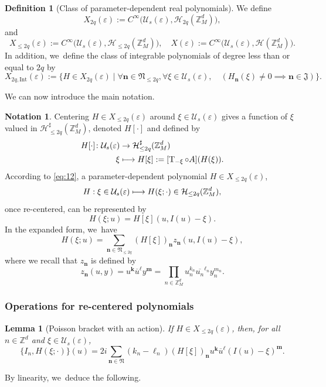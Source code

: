 \documentclass[10pt,a4paper]{amsart}
\newcommand\mto{\mathchoice{\longmapsto}{\mapsto}{\mapsto}{\mapsto}}
\theoremstyle{plain}
\newtheorem{lemma}[theorem]{Lemma}
\theoremstyle{definition}
\newtheorem{definition}[theorem]{Definition}
\newtheorem{notation}[theorem]{Notation}
\newcommand{\nb}{{\boldsymbol n}}
\newcommand{\kb}{{\boldsymbol k}}
\newcommand{\lb}{{\boldsymbol \ell}}
\newcommand{\mb}{{\boldsymbol m}}
\newcommand{\Nb}{{\boldsymbol{\mathfrak{N}}}}
\newcommand{\Z}{\mathbb{Z}}
\newcommand{\1}{\mathbf{1}}
\let\epsilon\varepsilon
\providecommand{\Subsubsection}{\subsubsection}
\providecommand{\Subsubsection}{\subsubsection}
\begin{document}
\begin{definition}[Class of parameter-dependent real polynomials]
\label{def:class}
We define
\begin{equation}
\label{eq:X}
X_{2q}(\epsilon):= C^{\infty}
\big(
\mathcal{U}_{s}(\epsilon),\mathcal{H}_{2q}(\Z_{M}^{d})
\big),
\end{equation}
and
\[
X_{\leq 2q}(\epsilon):= C^{\infty}
\big(
\mathcal{U}_{s}(\epsilon),\mathcal{H}_{\leq 2q}(\Z_{M}^{d})
\big),
\quad
X(\epsilon):= C^{\infty}
\big(
\mathcal{U}_{s}(\epsilon),\mathcal{H}(\Z_{M}^{d})
\big).
\]
In addition, we~define the class of integrable polynomials of degree less than or equal to $2q$ by
\[
X_{2q,\mathrm{Int}}(\epsilon) :=
\{
H\in X_{2q}(\epsilon)\mid \forall \nb\in\Nb_{\leq2q},\forall \xi\in\mathcal{U}_{s}(\epsilon),\quad (H_{\nb}(\xi)\neq0 \implies \nb\in\mathfrak{J})
\}.
\]
\end{definition}

We can now introduce the main notation.
\begin{notation}
\label{not}
Centering $H\in X_{\leq2q}(\epsilon)$ around $\xi\in\mathcal{U}_{s}(\epsilon)$ gives a function of $\xi$ valued in $\mathcal{H}_{\leq 2q}^{\sharp}(\Z_{M}^{d})$, denoted $H[\cdot]$ and defined by
\[
\begin{aligned}
H[\cdot]\colon\mathcal{U}_{s}(\epsilon)&
\to\mathcal{H}_{\leq 2q}^{\sharp}(\Z_{M}^{d})\\
\xi&\mto H[\xi]:=[\operatorname{T}_{-\xi}\circ A](H(\xi)).
\end{aligned}
\]
According to \eqref{eq:12}, a parameter-dependent polynomial $H\in X_{\leq2q}(\epsilon)$,
\[
H: \xi\in\mathcal{U}_{s}(\epsilon)\mto H(\xi;\cdot) \in \mathcal{H}_{\leq2q}(\Z_{M}^{d}),
\]
once re-centered, can be represented by
\begin{equation}
\label{eq:H-cano}
H(\xi;u) = H[\xi](u,I(u)-\xi).
\end{equation}
In the expanded form, we~have
\[
H(\xi;u) = \sum_{\nb\in\Nb_{\leq2q}}(H[\xi])_{\nb}z_{\nb}(u,I(u)-\xi),
\]
where we recall that $z_{\nb}$ is defined by
\[
z_{\nb}(u,y) = u^{\kb}\overline{u}^{\lb}y^{\mb} = \prod_{n\in\Z_{M}^{d}}u_{n}^{k_{n}}\overline{u_{n}}^{\ell_{n}}y_{n}^{m_{n}}.
\]
\end{notation}

\Subsubsection{Operations for re-centered polynomials}
\begin{lemma}[Poisson bracket with an action] If $H\in X_{\leq2q}(\epsilon)$, then, for all $n\in\Z^{d}$ and $\xi\in\mathcal{U}_{s}(\epsilon)$,
\begin{equation}
\label{eq:brak-I}
\{I_{n},H(\xi;\cdot)\}(u)
= 2i\sum_{\nb\in\Nb}(k_{n}-\ell_{n})(H[\xi])_{\nb}u^{\kb}\overline{u}^{\lb}(I(u)-\xi)^{\mb}.
\end{equation}
\end{lemma}
By linearity, we~deduce the following.
\end{document}
